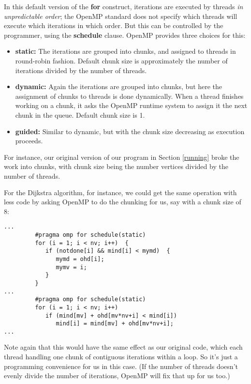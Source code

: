 In this default version of the {\bf for} construct, iterations are
executed by threads {\it in unpredictable order}; the OpenMP standard
does not specify which threads will execute which iterations in which
order.  But this can be controlled by the programmer, using the {\bf
schedule} clause.  OpenMP provides three choices for this:

\begin{itemize}

\item {\bf static:}  The iterations are grouped into chunks, and
assigned to threads in round-robin fashion.  Default chunk size is
approximately the number of iterations divided by the number of threads.

\item {\bf dynamic:}  Again the iterations are grouped into chunks, but
here the assignment of chunks to threads is done dynamically.  When a
thread finishes working on a chunk, it asks the OpenMP runtime system to
assign it the next chunk in the queue.  Default chunk size is 1.

\item {\bf guided:}  Similar to dynamic, but with the chunk size
decreasing as execution proceeds.

\end{itemize}

For instance, our original version of our program in Section
\ref{running} broke the work into chunks, with chunk size being the
number vertices divided by the number of threads.

For the Dijkstra algorithm, for instance, we could get the same
operation with less code by asking OpenMP to do the chunking for us, say
with a chunk size of 8:

\begin{Verbatim}[fontsize=\relsize{-2}]
...
         #pragma omp for schedule(static)
         for (i = 1; i < nv; i++)  {
            if (notdone[i] && mind[i] < mymd)  {
               mymd = ohd[i];
               mymv = i;
            }
         }
...
         #pragma omp for schedule(static)
         for (i = 1; i < nv; i++)
            if (mind[mv] + ohd[mv*nv+i] < mind[i])
               mind[i] = mind[mv] + ohd[mv*nv+i];
...
\end{Verbatim}

Note again that this would have the same effect as our original code,
which each thread handling one chunk of contiguous iterations within a
loop.  So it's just a programming convenience for us in this case.  (If
the number of threads doesn't evenly divide the number of iterations,
OpenMP will fix that up for us too.)

